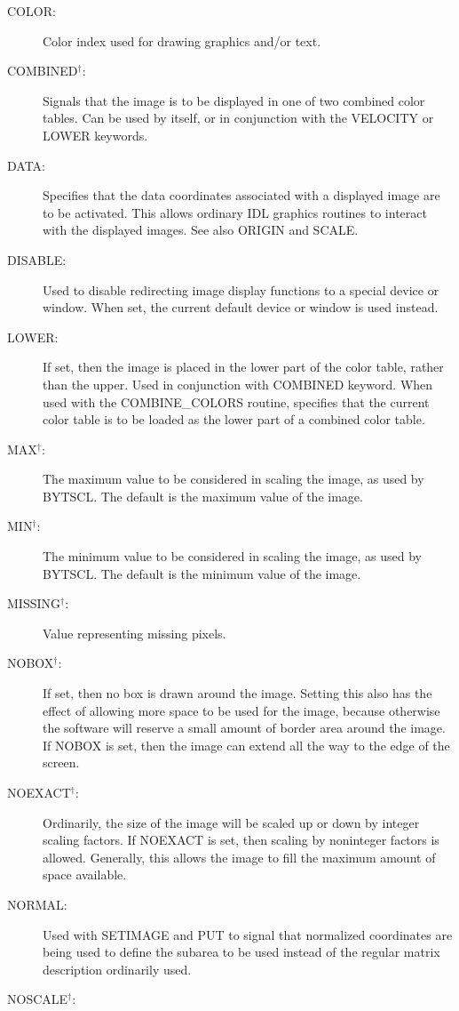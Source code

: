 \begin{description}
\item[COLOR:]
Color index used for drawing graphics and/or text.
\item[COMBINED$^\dagger$:]
Signals that the image is to be displayed in one of two combined color tables.
Can be used by itself, or in conjunction with the VELOCITY or LOWER keywords.
\item[DATA:]
Specifies that the data coordinates associated with a displayed image are to be
activated.  This allows ordinary IDL graphics routines to interact with the
displayed images.  See also ORIGIN and SCALE.
\item[DISABLE:]
Used to disable redirecting image display functions to a special device or
window.  When set, the current default device or window is used instead.
\item[LOWER:]
If set, then the image is placed in the lower part of the color table, rather
than the upper.  Used in conjunction with COMBINED keyword.  When used with the
COMBINE\_COLORS routine, specifies that the current color table is to be loaded
as the lower part of a combined color table.
\item[MAX$^\dagger$:]
The maximum value to be considered in scaling the image, as used by BYTSCL.
The default is the maximum value of the image.
\item[MIN$^\dagger$:]
The minimum value to be considered in scaling the image, as used by BYTSCL.
The default is the minimum value of the image.
\item[MISSING$^\dagger$:]
Value representing missing pixels.
\item[NOBOX$^\dagger$:]
If set, then no box is drawn around the image.  Setting this also has the
effect of allowing more space to be used for the image, because otherwise the
software will reserve a small amount of border area around the image.  If NOBOX
is set, then the image can extend all the way to the edge of the screen.
\item[NOEXACT$^\dagger$:]
Ordinarily, the size of the image will be scaled up or down by integer scaling
factors.  If NOEXACT is set, then scaling by noninteger factors is allowed.
Generally, this allows the image to fill the maximum amount of space available.
\item[NORMAL:]
Used with SETIMAGE and PUT to signal that normalized coordinates are being used
to define the subarea to be used instead of the regular matrix description
ordinarily used.
\item[NOSCALE$^\dagger$:]

\end{description}
